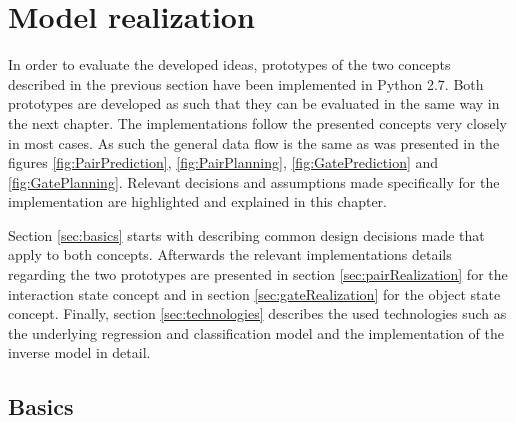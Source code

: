\chapter{Model realization\label{chap:modelReal}}




In order to evaluate the developed ideas, prototypes of the two concepts described in the previous section have been implemented in Python 2.7. Both prototypes are developed as such that they can be evaluated in the same way in the next chapter. The implementations follow the presented concepts very closely in most cases. As such the general data flow is the same as was presented in the figures  \ref{fig:PairPrediction}, \ref{fig:PairPlanning}, \ref{fig:GatePrediction} and \ref{fig:GatePlanning}.
Relevant decisions and assumptions made specifically for the implementation are highlighted and explained in this chapter. %

Section \ref{sec:basics} starts with describing common design decisions made that apply to both concepts. Afterwards the relevant implementations details regarding the two prototypes are presented in section \ref{sec:pairRealization} for the interaction state concept and in section \ref{sec:gateRealization} for the object state concept. Finally, section \ref{sec:technologies} describes the used technologies such as the underlying regression and classification model and the implementation of the inverse model in detail.

\section{Basics \label{sec:basics}}


